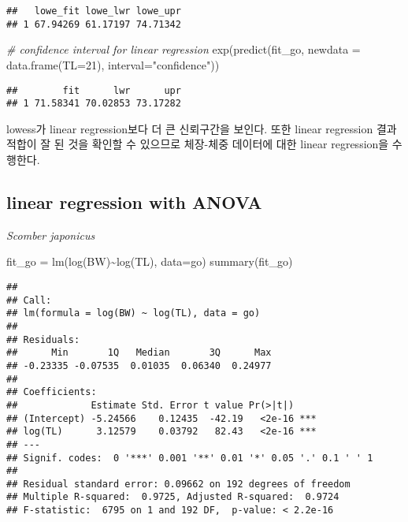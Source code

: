 \documentclass[
]{article}
\newenvironment{Shaded}{\begin{snugshade}}{\end{snugshade}}
\newcommand{\AttributeTok}[1]{\textcolor[rgb]{0.77,0.63,0.00}{#1}}
\newcommand{\CommentTok}[1]{\textcolor[rgb]{0.56,0.35,0.01}{\textit{#1}}}
\newcommand{\DecValTok}[1]{\textcolor[rgb]{0.00,0.00,0.81}{#1}}
\newcommand{\FunctionTok}[1]{\textcolor[rgb]{0.00,0.00,0.00}{#1}}
\newcommand{\NormalTok}[1]{#1}
\newcommand{\OtherTok}[1]{\textcolor[rgb]{0.56,0.35,0.01}{#1}}
\newcommand{\SpecialCharTok}[1]{\textcolor[rgb]{0.00,0.00,0.00}{#1}}
\newcommand{\StringTok}[1]{\textcolor[rgb]{0.31,0.60,0.02}{#1}}
\begin{document}
\begin{verbatim}
##   lowe_fit lowe_lwr lowe_upr
## 1 67.94269 61.17197 74.71342
\end{verbatim}

\begin{Shaded}
\begin{Highlighting}[]
\CommentTok{\# confidence interval for linear regression}
\FunctionTok{exp}\NormalTok{(}\FunctionTok{predict}\NormalTok{(fit\_go, }\AttributeTok{newdata =} \FunctionTok{data.frame}\NormalTok{(}\AttributeTok{TL=}\DecValTok{21}\NormalTok{), }\AttributeTok{interval=}\StringTok{"confidence"}\NormalTok{)) }
\end{Highlighting}
\end{Shaded}

\begin{verbatim}
##        fit      lwr      upr
## 1 71.58341 70.02853 73.17282
\end{verbatim}

lowess가 linear regression보다 더 큰 신뢰구간을 보인다. 또한 linear
regression 결과 적합이 잘 된 것을 확인할 수 있으므로 체장-체중 데이터에
대한 linear regression을 수행한다.

\hypertarget{linear-regression-with-anova}{%
\subsection{linear regression with
ANOVA}\label{linear-regression-with-anova}}

\emph{Scomber japonicus}

\begin{Shaded}
\begin{Highlighting}[]
\NormalTok{fit\_go }\OtherTok{=} \FunctionTok{lm}\NormalTok{(}\FunctionTok{log}\NormalTok{(BW)}\SpecialCharTok{\textasciitilde{}}\FunctionTok{log}\NormalTok{(TL), }\AttributeTok{data=}\NormalTok{go)}
\FunctionTok{summary}\NormalTok{(fit\_go)}
\end{Highlighting}
\end{Shaded}

\begin{verbatim}
## 
## Call:
## lm(formula = log(BW) ~ log(TL), data = go)
## 
## Residuals:
##      Min       1Q   Median       3Q      Max 
## -0.23335 -0.07535  0.01035  0.06340  0.24977 
## 
## Coefficients:
##             Estimate Std. Error t value Pr(>|t|)    
## (Intercept) -5.24566    0.12435  -42.19   <2e-16 ***
## log(TL)      3.12579    0.03792   82.43   <2e-16 ***
## ---
## Signif. codes:  0 '***' 0.001 '**' 0.01 '*' 0.05 '.' 0.1 ' ' 1
## 
## Residual standard error: 0.09662 on 192 degrees of freedom
## Multiple R-squared:  0.9725, Adjusted R-squared:  0.9724 
## F-statistic:  6795 on 1 and 192 DF,  p-value: < 2.2e-16
\end{verbatim}
\end{document}

